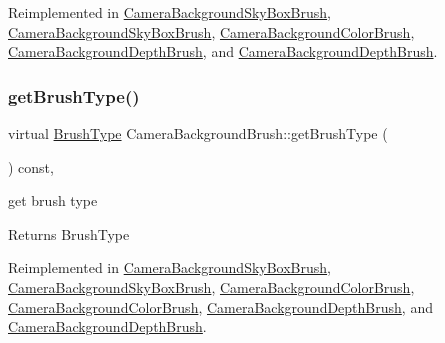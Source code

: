 Reimplemented in \hyperlink{classCameraBackgroundSkyBoxBrush_ac7f69194164c51712f6b2d556ce795c7}{Camera\+Background\+Sky\+Box\+Brush}, \hyperlink{classCameraBackgroundSkyBoxBrush_aa01f6019518a0428872e8307962647fa}{Camera\+Background\+Sky\+Box\+Brush}, \hyperlink{classCameraBackgroundColorBrush_aa07e5c7ea9d5c233c51920bf75d1381b}{Camera\+Background\+Color\+Brush}, \hyperlink{classCameraBackgroundDepthBrush_aa87e44c303dcf8e2560ee56d5c8fee58}{Camera\+Background\+Depth\+Brush}, and \hyperlink{classCameraBackgroundDepthBrush_afe438cdd7dbcf77d6421ec50224579d1}{Camera\+Background\+Depth\+Brush}.

\mbox{\label{classCameraBackgroundBrush_a72447fd86e40e0d7e263b906c2f9af12}} 
\subsubsection{\texorpdfstring{get\+Brush\+Type()}{getBrushType()}\hspace{0.1cm}{\footnotesize\ttfamily [1/2]}}
{\footnotesize\ttfamily virtual \hyperlink{classCameraBackgroundBrush_acb83e8d05e7ab9386c041d22c444760f}{Brush\+Type} Camera\+Background\+Brush\+::get\+Brush\+Type (\begin{DoxyParamCaption}{ }\end{DoxyParamCaption}) const\hspace{0.3cm}{\ttfamily [inline]}, {\ttfamily [virtual]}}

get brush type \begin{DoxyReturn}{Returns}
Brush\+Type 
\end{DoxyReturn}


Reimplemented in \hyperlink{classCameraBackgroundSkyBoxBrush_a2db3e09fced9ed84fb3e5df9f24bba8e}{Camera\+Background\+Sky\+Box\+Brush}, \hyperlink{classCameraBackgroundSkyBoxBrush_a2db3e09fced9ed84fb3e5df9f24bba8e}{Camera\+Background\+Sky\+Box\+Brush}, \hyperlink{classCameraBackgroundColorBrush_a96ecf77baa742b668db0d22c350b8f1b}{Camera\+Background\+Color\+Brush}, \hyperlink{classCameraBackgroundColorBrush_a96ecf77baa742b668db0d22c350b8f1b}{Camera\+Background\+Color\+Brush}, \hyperlink{classCameraBackgroundDepthBrush_ad4cc258ce1a1cd3ac43ea0d2580409d5}{Camera\+Background\+Depth\+Brush}, and \hyperlink{classCameraBackgroundDepthBrush_ad4cc258ce1a1cd3ac43ea0d2580409d5}{Camera\+Background\+Depth\+Brush}.

